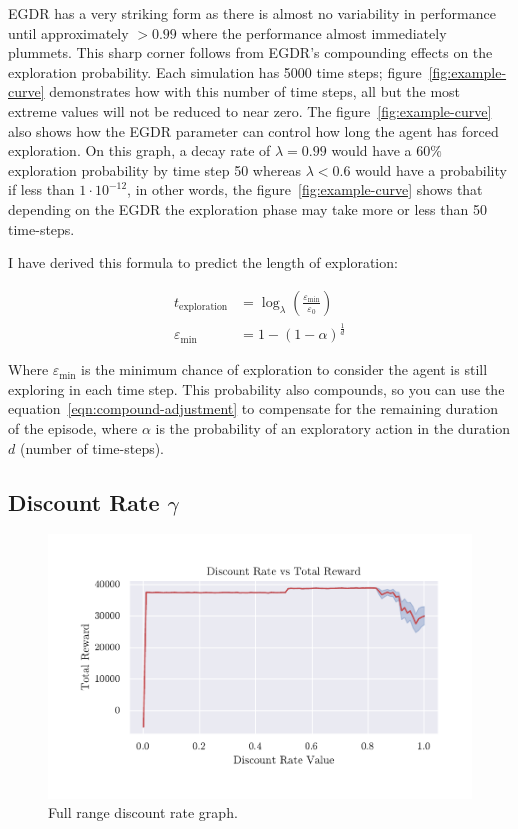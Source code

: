 \documentclass[]{final_report}
\begin{document}
EGDR has a very striking form as there is almost no variability in performance until approximately $>0.99$ where the performance almost immediately plummets. This sharp corner follows from EGDR's compounding effects on the exploration probability. Each simulation has 5000 time steps; figure~\ref {fig:example-curve} demonstrates how with this number of time steps, all but the most extreme values will not be reduced to near zero. The figure~\ref{fig:example-curve} also shows how the EGDR parameter can control how long the agent has forced exploration. On this graph, a decay rate of $\lambda = 0.99$ would have a $60\%$ exploration probability by time step 50 whereas $\lambda < 0.6$ would have a probability if less than $1 \cdot 10^{-12}$, in other words, the figure~\ref{fig:example-curve} shows that depending on the EGDR the exploration phase may take more or less than 50 time-steps. 


I have derived this formula to predict the length of exploration:

\begin{align}
  t_{\text{exploration}} &= \log_{\lambda}(\frac{\varepsilon_{\text{min}}}{\varepsilon_0}) \\
  \varepsilon_{\text{min}} &= 1 - (1-\alpha)^{\frac{1}{d}} \label{eqn:compound-adjustment} 
\end{align}

Where $\varepsilon_{\text{min}}$ is the minimum chance of exploration to consider the agent is still exploring in each time step. This probability also compounds, so you can use the equation~\ref{eqn:compound-adjustment} to compensate for the remaining duration of the episode, where $\alpha$ is the probability of an exploratory action in the duration $d$ (number of time-steps). 



\subsection{Discount Rate \texorpdfstring{$\gamma$}{Lg}}

\begin{figure}[H]
  \centering
  
  \includegraphics[trim={0 1cm 0 1cm},clip,width=\textwidth]{hyper-paramiters/discount-rate-full}
  
  \caption{\label{fig:discount-rate-full}Full range discount rate graph.}
\end{figure}
\end{document}
